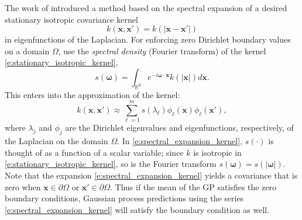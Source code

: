 \label{spectral_expansion_approach}
The work of  introduced a method based on the spectral expansion of a desired stationary isotropic covariance kernel 
\begin{equation}\label{e:stationary_isotropic_kernel}
k(\mathbf{x},\mathbf{x}') = k(|\mathbf{x}-\mathbf{x}'|)
\end{equation}
in eigenfunctions of the Laplacian. For enforcing zero Dirichlet boundary values on a domain $\Omega$,  use the \emph{spectral density} (Fourier transform) of the kernel \eqref{e:stationary_isotropic_kernel},
\begin{equation}
\label{e:spectral_density}
s(\bm{\omega}) = \int_{\mathbb{R}^d}
e^{-i \bm{\omega} \cdot \mathbf{x}} 
k(|\mathbf{x}|)
d\mathbf{x}. 
\end{equation}
This enters into the approximation of the kernel:
\begin{equation}\label{e:spectral_expansion_kernel}
k(\mathbf{x},\mathbf{x}') \approx \sum_{\ell=1}^m 
s(\lambda_\ell) \phi_\ell(\mathbf{x}) \phi_\ell(\mathbf{x}'),
\end{equation}
where $\lambda_j$ and $\phi_j$ are the Dirichlet eigenvalues and eigenfunctions, respectively, of the Laplacian on the domain $\Omega$.
In \eqref{e:spectral_expansion_kernel}, $s(\cdot)$ is thought of as a function of a scalar variable; since $k$ is isotropic in \eqref{e:stationary_isotropic_kernel}, so is the Fourier transform $s(\bm{\omega}) = s(|\bm{\omega}|)$.  
Note that the expansion \eqref{e:spectral_expansion_kernel} yields a covariance that is zero when $\mathbf{x} \in \partial\Omega$ or $\mathbf{x}' \in \partial\Omega$.  
Thus if the mean of the GP satisfies the zero boundary conditions, Gaussian process predictions using the series \eqref{e:spectral_expansion_kernel} will satisfy the boundary condition as well.

